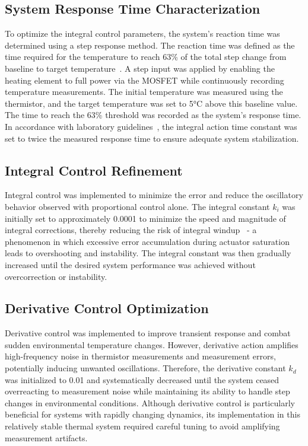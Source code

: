 \subsection{System Response Time Characterization}
\label{subsec:system-response-time-characterization}

To optimize the integral control parameters, the system's reaction time was
determined using a step response method.
The reaction time was defined as the time required for the temperature to
reach 63\% of the total step change from baseline to target
temperature~\cite{step_response_wiki}.
A step input was applied by enabling the heating element to full power via the
MOSFET while continuously recording temperature measurements.
The initial temperature was measured using the thermistor, and the target
temperature was set to 5°C above this baseline value.
The time to reach the 63\% threshold was recorded as the system's response
time.
In accordance with laboratory guidelines~\cite{lab_guidelines}, the integral
action time constant was set to twice the measured response time to ensure
adequate system stabilization.

\subsection{Integral Control Refinement}
\label{subsec:integral-control-refinement}

Integral control was implemented to minimize the error and reduce the
oscillatory behavior observed with proportional control alone.
The integral constant \(k_i\) was initially set to approximately 0.0001 to
minimize the speed and magnitude of integral corrections, thereby reducing the
risk of integral windup~\cite{pid_integral_windup_controlcom} - a phenomenon
in which excessive error accumulation during actuator saturation leads to
overshooting and instability.
The integral constant was then gradually increased until the desired system
performance was achieved without overcorrection or instability.

\subsection{Derivative Control Optimization}
\label{subsec:derivative-control-optimization}

Derivative control was implemented to improve transient response and combat
sudden environmental temperature changes.
However, derivative action amplifies high-frequency noise in thermistor
measurements and measurement errors, potentially inducing unwanted
oscillations.
Therefore, the derivative constant \(k_d\) was initialized to 0.01 and
systematically decreased until the system ceased overreacting to measurement
noise while maintaining its ability to handle step changes in environmental
conditions.
Although derivative control is particularly beneficial for systems with
rapidly changing dynamics, its implementation in this relatively stable
thermal system required careful tuning to avoid amplifying measurement artifacts.


